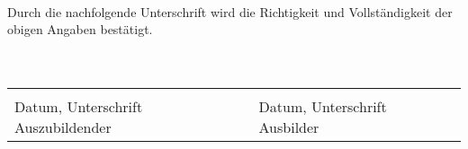 \documentclass[10pt,a4paper]{article}
\begin{document}
\\
\\\\
Durch die nachfolgende Unterschrift wird die Richtigkeit und Vollständigkeit der obigen Angaben bestätigt.
\\
\\\\
%
%
\begin{tabular}{l p{3cm} l l}
  &&\\ \cline{1-1} \cline{3-3}
  \scriptsize Datum, Unterschrift Auszubildender &&  \scriptsize Datum, Unterschrift Ausbilder\\
\end{tabular}
\end{document}
